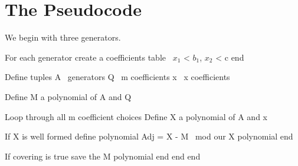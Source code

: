 \section{The Pseudocode}




We begin with three generators.
\begin{centering}
\begin{block}
For each generator
	create a coefficients table  \ $x_1$ < $b_1$, $x_2$ < c
end

Define tuples
	A \ generators
	Q \ m coefficients
	x  \ x coefficients

Define M a polynomial of A and Q

Loop through all m coefficient choices
	Define X a polynomial of A and x

	If X is well formed
		define polynomial
			Adj = X - M \ mod our X polynomial
		end

		If covering is true
			save the M polynomial
		end
	end
end

\end{block}
\end{centering}
